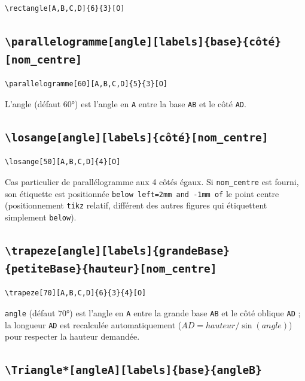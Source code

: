 \documentclass[11pt,a4paper]{article}
\newcommand{\cmdname}[1]{\texttt{\textbackslash#1}}
\begin{document}
\begin{lstlisting}
\rectangle[A,B,C,D]{6}{3}[O]
\end{lstlisting}

\subsection{\cmdname{parallelogramme[angle][labels]\{base\}\{côté\}[nom\_centre]}}

\begin{lstlisting}
\parallelogramme[60][A,B,C,D]{5}{3}[O]
\end{lstlisting}

L'angle (défaut $60°$) est l'angle en \texttt{A} entre la base \texttt{AB} et le côté \texttt{AD}.

\subsection{\cmdname{losange[angle][labels]\{côté\}[nom\_centre]}}

\begin{lstlisting}
\losange[50][A,B,C,D]{4}[O]
\end{lstlisting}

Cas particulier de parallélogramme aux 4 côtés égaux. Si \texttt{nom\_centre} est fourni, son étiquette est positionnée \texttt{below left=2mm and -1mm of} le point centre (positionnement \texttt{tikz} relatif, différent des autres figures qui étiquettent simplement \texttt{below}).

\subsection{\cmdname{trapeze[angle][labels]\{grandeBase\}\{petiteBase\}\{hauteur\}[nom\_centre]}}

\begin{lstlisting}
\trapeze[70][A,B,C,D]{6}{3}{4}[O]
\end{lstlisting}

\texttt{angle} (défaut $70°$) est l'angle en \texttt{A} entre la grande base \texttt{AB} et le côté oblique \texttt{AD} ; la longueur \texttt{AD} est recalculée automatiquement ($AD = hauteur/\sin(angle)$) pour respecter la hauteur demandée.

\subsection{\cmdname{Triangle*[angleA][labels]\{base\}\{angleB\}}}
\end{document}
